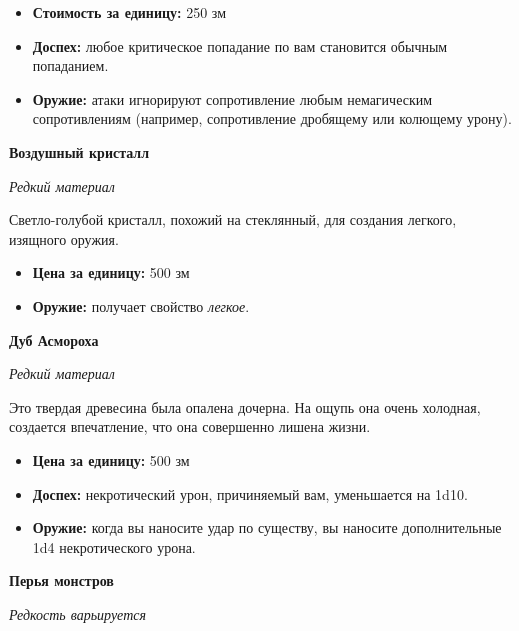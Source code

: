 \documentclass[a4paper, 9pt, twocolumn]{book}
\begin{document}
	\begin{itemize}
		\item \textbf{Стоимость за единицу:} 250 зм
		
		\item \textbf{Доспех:} любое критическое попадание по вам становится обычным попаданием.
		
		\item \textbf{Оружие:} атаки игнорируют сопротивление любым немагическим сопротивлениям (например, сопротивление дробящему или колющему урону).
	\end{itemize}

	\noindent\textbf{Воздушный кристалл}
	
	\noindent \textit{Редкий материал}
	
	\smallskip
	
	\noindent Светло-голубой кристалл, похожий на стеклянный, для создания легкого, изящного оружия.
	
	\smallskip
	
	\begin{itemize}
		\item \textbf{Цена за единицу:} 500 зм
		
		\item \textbf{Оружие:} получает свойство \textit{легкое}.
	\end{itemize}

	\noindent \textbf{Дуб Асмороха}
	
	\noindent \textit{Редкий материал}
	
	\smallskip
	
	\noindent Это твердая древесина была опалена дочерна. На ощупь она очень холодная, создается впечатление, что она совершенно лишена жизни.
	
	\begin{itemize}
		\item \textbf{Цена за единицу:} 500 зм
		
		\item \textbf{Доспех:} некротический урон, причиняемый вам, уменьшается на 1d10.
		
		\item \textbf{Оружие:} когда вы наносите удар по существу, вы наносите дополнительные 1d4 некротического урона.
	\end{itemize}

	\noindent \textbf{Перья монстров}
	
	\noindent \textit{Редкость варьируется}
	
	\smallskip
	
\end{document}
